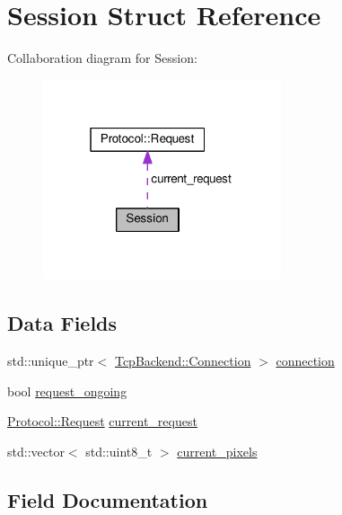 \hypertarget{structSession}{}\section{Session Struct Reference}
\label{structSession}


Collaboration diagram for Session\+:
\nopagebreak
\begin{figure}[H]
\begin{center}
\leavevmode
\includegraphics[width=199pt]{structSession__coll__graph}
\end{center}
\end{figure}
\subsection*{Data Fields}
\begin{DoxyCompactItemize}
\item 
std\+::unique\+\_\+ptr$<$ \hyperlink{classTcpBackend_1_1Connection}{Tcp\+Backend\+::\+Connection} $>$ \hyperlink{structSession_a55ef585b763a1a3e645b70826bbdb5ee}{connection}
\item 
bool \hyperlink{structSession_a7136254f114d887ab73172b395c040d5}{request\+\_\+ongoing}
\item 
\hyperlink{structProtocol_1_1Request}{Protocol\+::\+Request} \hyperlink{structSession_a1358d19f1cfc7e2ac6c2c6ad51ef2f42}{current\+\_\+request}
\item 
std\+::vector$<$ std\+::uint8\+\_\+t $>$ \hyperlink{structSession_a8000e4b6e8ab34810d9771a8d7bf59e6}{current\+\_\+pixels}
\end{DoxyCompactItemize}


\subsection{Field Documentation}
\mbox{\label{structSession_a55ef585b763a1a3e645b70826bbdb5ee}} 
